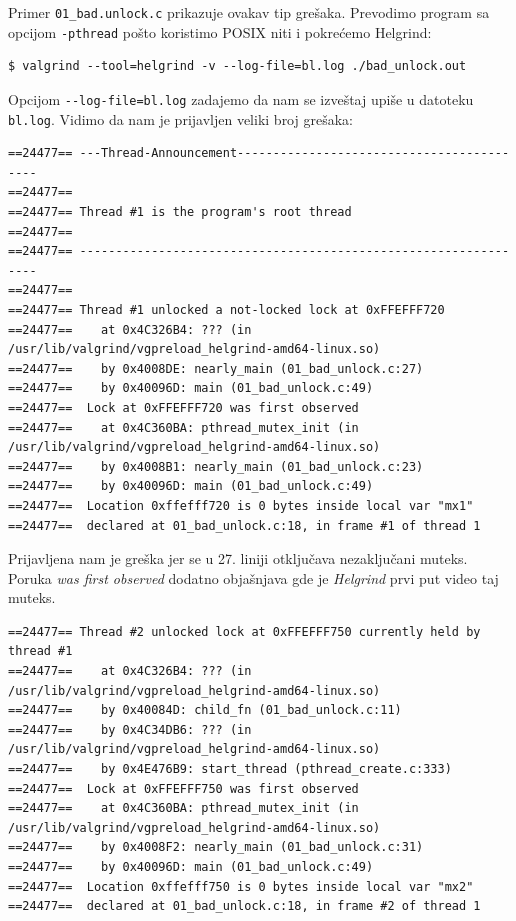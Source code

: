 Primer \texttt{01\_bad.unlock.c} prikazuje ovakav tip grešaka. Prevodimo program sa opcijom \texttt{-pthread} pošto koristimo POSIX niti i pokrećemo Helgrind:

\begin{verbatim}
$ valgrind --tool=helgrind -v --log-file=bl.log ./bad_unlock.out
\end{verbatim}

Opcijom \texttt{-{}-log-file=bl.log} zadajemo da nam se izveštaj upiše u datoteku \texttt{bl.log}. Vidimo da nam je prijavljen veliki broj grešaka:

\begin{verbatim}
==24477== ---Thread-Announcement------------------------------------------
==24477==
==24477== Thread #1 is the program's root thread
==24477==
==24477== ----------------------------------------------------------------
==24477==
==24477== Thread #1 unlocked a not-locked lock at 0xFFEFFF720
==24477==    at 0x4C326B4: ??? (in /usr/lib/valgrind/vgpreload_helgrind-amd64-linux.so)
==24477==    by 0x4008DE: nearly_main (01_bad_unlock.c:27)
==24477==    by 0x40096D: main (01_bad_unlock.c:49)
==24477==  Lock at 0xFFEFFF720 was first observed
==24477==    at 0x4C360BA: pthread_mutex_init (in /usr/lib/valgrind/vgpreload_helgrind-amd64-linux.so)
==24477==    by 0x4008B1: nearly_main (01_bad_unlock.c:23)
==24477==    by 0x40096D: main (01_bad_unlock.c:49)
==24477==  Location 0xffefff720 is 0 bytes inside local var "mx1"
==24477==  declared at 01_bad_unlock.c:18, in frame #1 of thread 1
\end{verbatim}

Prijavljena nam je greška jer se u 27. liniji otključava nezaključani muteks. Poruka \emph{was first observed} dodatno objašnjava gde je \emph{Helgrind} prvi put video taj muteks.

\begin{verbatim}
==24477== Thread #2 unlocked lock at 0xFFEFFF750 currently held by thread #1
==24477==    at 0x4C326B4: ??? (in /usr/lib/valgrind/vgpreload_helgrind-amd64-linux.so)
==24477==    by 0x40084D: child_fn (01_bad_unlock.c:11)
==24477==    by 0x4C34DB6: ??? (in /usr/lib/valgrind/vgpreload_helgrind-amd64-linux.so)
==24477==    by 0x4E476B9: start_thread (pthread_create.c:333)
==24477==  Lock at 0xFFEFFF750 was first observed
==24477==    at 0x4C360BA: pthread_mutex_init (in /usr/lib/valgrind/vgpreload_helgrind-amd64-linux.so)
==24477==    by 0x4008F2: nearly_main (01_bad_unlock.c:31)
==24477==    by 0x40096D: main (01_bad_unlock.c:49)
==24477==  Location 0xffefff750 is 0 bytes inside local var "mx2"
==24477==  declared at 01_bad_unlock.c:18, in frame #2 of thread 1
\end{verbatim}

